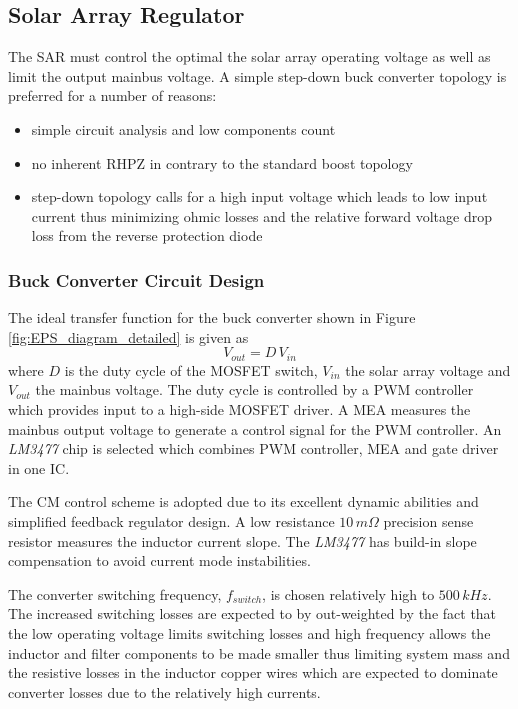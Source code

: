 \subsection{Solar Array Regulator}
The \ac{SAR} must control the optimal the solar array operating voltage as well as limit the output mainbus voltage. A simple step-down buck converter topology is preferred for a number of reasons:
%
\begin{itemize}
\item simple circuit analysis and low components count
\item no inherent \ac{RHPZ} in contrary to the standard boost topology
\item step-down topology calls for a high input voltage which leads to low input current thus minimizing ohmic losses and the relative forward voltage drop loss from the reverse protection diode
\end{itemize}
%
\subsubsection{Buck Converter Circuit Design}
The ideal transfer function for the buck converter shown in Figure \ref{fig:EPS_diagram_detailed} is given as
%
\begin{equation}
V_{out}=D\,V_{in}
\end{equation}
%
where $D$ is the duty cycle of the MOSFET switch, $V_{in}$ the solar array voltage and $V_{out}$ the mainbus voltage. The duty cycle is controlled by a \ac{PWM} controller which provides input to a high-side MOSFET driver. A \ac{MEA} measures the mainbus output voltage to generate a control signal for the PWM controller. An \textit{LM3477} chip is selected which combines \ac{PWM} controller, \ac{MEA} and gate driver in one \ac{IC}.

The \ac{CM} control scheme is adopted due to its excellent dynamic abilities\cite[sec. 12-3-6]{Fundamentals} and simplified feedback regulator design. A low resistance $10\,m \Omega$ precision sense resistor measures the inductor current slope. The \textit{LM3477} has build-in slope compensation to avoid current mode instabilities\cite[sec. 12-1]{Fundamentals}.

The converter switching frequency, $f_{switch}$, is chosen relatively high to $500\,kHz$. The increased switching losses are expected to by out-weighted by the fact that the low operating voltage limits switching losses and high frequency allows the inductor and filter components to be made smaller thus limiting system mass and the resistive losses in the inductor copper wires which are expected to dominate converter losses due to the relatively high currents.


